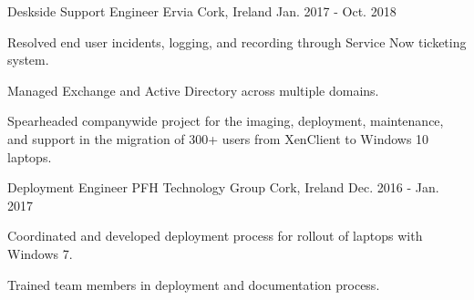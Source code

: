 \begin{cventries}
\cventry
{Deskside Support Engineer} %
{Ervia} %
{Cork, Ireland} %
{Jan. 2017 - Oct. 2018} %
{ %
\begin{cvitems}
\item {Resolved end user incidents, logging, and recording through Service Now ticketing system.}
\item {Managed Exchange and Active Directory across multiple domains.}
\item {Spearheaded companywide project for the imaging, deployment, maintenance, and support in the migration of 300+ users from XenClient to Windows 10 laptops.}
\end{cvitems}
}


\cventry
{Deployment Engineer} %
{PFH Technology Group} %
{Cork, Ireland} %
{Dec. 2016 - Jan. 2017} %
{ %
\begin{cvitems}
\item {Coordinated and developed deployment process for rollout of laptops with Windows 7.}
\item {Trained team members in deployment and documentation process.}
\end{cvitems}
}

\end{cventries}
